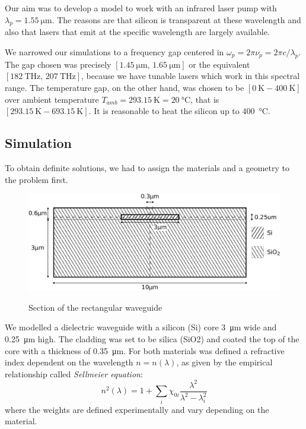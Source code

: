\documentclass[12pt,a4paper,twoside]{article}
\begin{document}
Our aim was to develop a model to work with an infrared laser pump with $\lambda_{p} = \SI{1.55}{\um}$.
The reasons are that silicon is transparent at these wavelength and also that lasers that emit at the specific wavelength are largely available.

We narrowed our simulations to a frequency gap centered in $\omega_p = 2\pi \nu_p = 2\pi c / \lambda_{p}$.
The gap chosen was precisely $[\SI{1.45}{\um} ,\, \SI{1.65}{\um}]$ or the equivalent $[\SI{182}{\THz} ,\, \SI{207}{\THz}]$, because we have tunable lasers which work in this spectral range.
The temperature gap, on the other hand, was chosen to be $[\SI{0}{\K} - \SI{400}{\K}]$ over ambient temperature $T_{amb} = \SI{293.15}{\K} = \SI{20}{\celsius}$, that is $[\SI{293.15}{\K} - \SI{693.15}{\K}]$. It is reasonable to heat the silicon up to \SI{400}{\celsius}.

\subsection{Simulation}
To obtain definite solutions, we had to assign the materials and a geometry to the problem first.

\begin{figure}[ht]
	\centering
	\includegraphics[width=1\textwidth]{geometry.png}
	\label{fig_wg_Section}
	\caption{Section of the rectangular waveguide}
\end{figure}

We modelled a dielectric waveguide with a silicon (Si) core \SI{3}{\um} wide and \SI{.25}{\um} high.
The cladding was set to be silica (SiO2) and coated the top of the core with a thickness of \SI{.35}{\um}.
For both materials was defined a refractive index dependent on the wavelength $n=n(\lambda)$, as given by the empirical relationship called \textit{Sellmeier equation}:
\begin{equation}
	n^2(\lambda) = 1+ \sum_i \chi_{0i}\frac{\lambda^2}{\lambda^2-\lambda^2_i}
	\label{eq_sellmeier}
\end{equation}
where the weights are defined experimentally and vary depending on the material.
\end{document}
